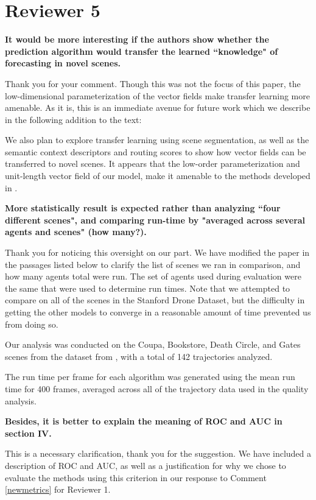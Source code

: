 \documentclass[usenames,dvipsnames]{article}
\providecommand{\response}[1]{
\noindent
\noindent\colorbox{gray!20}{
\parbox{\textwidth}{
\setlength{\parskip}{.1in}
\setlength{\parindent}{.1in}
#1}
}
}
\begin{document}
\section*{Reviewer 5}
\begin{enumerate}
\begin{item}
\textbf{
It would be more interesting if the authors show whether
the prediction algorithm would transfer the learned ``knowledge" of
forecasting in novel scenes.}

Thank you for your comment. 
Though this was not the focus of this paper, the low-dimensional parameterization of the vector fields make transfer learning more amenable. 
As it is, this is an immediate avenue for future work which we describe in the following addition to the text: 
\reversemarginpar{}
\response{We also plan to explore transfer learning using scene segmentation, as well as the semantic context descriptors and routing scores to show how vector fields can be transferred to novel scenes. It appears that the low-order parameterization and unit-length vector field of our model, make it amenable to the methods developed in \cite{Ballan2016}.}


\end{item}
\begin{item}
\textbf{
More statistically result is expected
rather than analyzing ``four different scenes", and comparing run-time
by "averaged across several agents and scenes" (how many?).}

Thank you for noticing this oversight on our part. 
We have modified the paper in the passages listed below to clarify the list of scenes we ran in comparison, and how many agents total were run. 
The set of agents used during evaluation were the same that were used to determine run times. 
Note that we attempted to compare on all of the scenes in the Stanford Drone Dataset, but the difficulty in getting the other models to converge in a reasonable amount of time prevented us from doing so.

\reversemarginpar{}
\response{ Our analysis was conducted on the Coupa, Bookstore, Death Circle, and Gates scenes from the dataset from \cite{Robicquet2016}, with a total of 142 trajectories analyzed.}

\reversemarginpar{}
\response{The run time per frame for each algorithm was generated using the mean run time for 400 frames, averaged across all of the trajectory data used in the quality analysis.}
\end{item}

\begin{item}
\textbf{
Besides, it is better to explain the meaning of ROC and AUC in section IV.}

This is a necessary clarification, thank you for the suggestion. 
We have included a description of ROC and AUC, as well as a justification for why we chose to evaluate the methods using this criterion in our response to Comment \ref{newmetrics} for Reviewer 1.

\end{item}
\end{enumerate}
\end{document}
